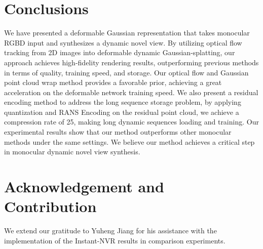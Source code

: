 \section{Conclusions}
We have presented a deformable Gaussian representation that takes monocular RGBD input and synthesizes a dynamic novel view. By utilizing optical flow tracking from 2D images into deformable dynamic Gaussian-splatting, our approach achieves high-fidelity rendering results, outperforming previous methods in terms of quality, training speed, and storage. Our optical flow and Gaussian point cloud wrap method provides a favorable prior, achieving a great acceleration on the deformable network training speed. We also present a residual encoding method to address the long sequence storage problem, by applying quantization and RANS Encoding on the residual point cloud, we achieve a compression rate of 25, making long dynamic sequences loading and training. Our experimental results show that our method outperforms other monocular methods under the same settings. We believe our method achieves a critical step in monocular dynamic novel view synthesis. 


\section{Acknowledgement and Contribution}
We extend our gratitude to Yuheng Jiang for his assistance with the implementation of the Instant-NVR results in comparison experiments.

